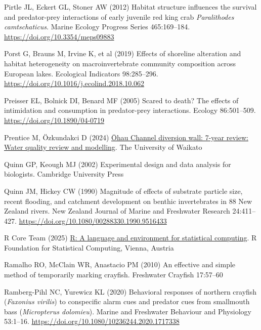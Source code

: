 \documentclass[
  12pt,
  a4paper,
  oneside]{scrbook}
\newlength{\cslhangindent}
\newenvironment{CSLReferences}[2] %
 {\begin{list}{}{%
  \setlength{\itemindent}{0pt}
  \setlength{\leftmargin}{0pt}
  \setlength{\parsep}{0pt}
  \ifodd #1
   \setlength{\leftmargin}{\cslhangindent}
   \setlength{\itemindent}{-1\cslhangindent}
  \fi
  \setlength{\itemsep}{#2\baselineskip}}}
 {\end{list}}
\begin{document}
\begin{CSLReferences}{1}{1}
Pirtle JL, Eckert GL, Stoner AW (2012) Habitat structure influences the
survival and predator-prey interactions of early juvenile red king crab
{\emph{Paralithodes camtschaticus}}. Marine Ecology Progress Series
465:169--184. \url{https://doi.org/10.3354/meps09883}

Porst G, Brauns M, Irvine K, et al (2019) Effects of shoreline
alteration and habitat heterogeneity on macroinvertebrate community
composition across {European} lakes. Ecological Indicators 98:285--296.
\url{https://doi.org/10.1016/j.ecolind.2018.10.062}

Preisser EL, Bolnick DI, Benard MF (2005) Scared to death? The effects
of intimidation and consumption in predator-prey interactions. Ecology
86:501--509. \url{https://doi.org/10.1890/04-0719}

Prentice M, Özkundakci D (2024)
\href{https://doi.org/10.15663/eri.report.169}{{Ōhau Channel} diversion
wall: 7-year review: Water quality review and modelling}. The University
of Waikato

Quinn GP, Keough MJ (2002) Experimental design and data analysis for
biologists. Cambridge University Press

Quinn JM, Hickey CW (1990) Magnitude of effects of substrate particle
size, recent flooding, and catchment development on benthic
invertebrates in 88 {New Zealand} rivers. New Zealand Journal of Marine
and Freshwater Research 24:411--427.
\url{https://doi.org/10.1080/00288330.1990.9516433}

R Core Team (2025) \href{https://www.R-project.org/}{{R}: A language and
environment for statistical computing}. R Foundation for Statistical
Computing, Vienna, Austria

Ramalho RO, McClain WR, Anastacio PM (2010) An effective and simple
method of temporarily marking crayfish. Freshwater Crayfish 17:57--60

Ramberg-Pihl NC, Yurewicz KL (2020) Behavioral responses of northern
crayfish ({\emph{Faxonius virilis}}) to conspecific alarm cues and
predator cues from smallmouth bass ({\emph{Micropterus dolomieu}}).
Marine and Freshwater Behaviour and Physiology 53:1--16.
\url{https://doi.org/10.1080/10236244.2020.1717338}


\end{CSLReferences}
\end{document}
